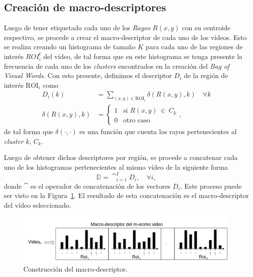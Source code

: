 	\subsection{Creación de macro-descriptores}
	\label{algoritmo:crea_macro-descriptores}
	Luego de tener etiquetado cada uno de los \textit{Rayos} $R(x,y)$ con su centroide respectivo, se procede a crear el macro-descriptor de cada uno de los vídeos.	 Esto se realiza creando un histograma de tamaño $K$ para cada uno de las regiones de interés ${ROI}_{i}^{t}$ del vídeo, de tal forma que en este histograma se tenga presente la frecuencia de cada uno de los \textit{clusters} encontrados en la creación del \textit{Bag of Visual Words}. Con esto presente, definimos el descriptor $D_i$ de la región de interés $\text{ROI}_i$ como
	\begin{align}
		\label{algoritmo:eq:hist}
		D_i(k) &= \sum_{(x,y)\in \text{ROI}_i} \delta (R(x,y),k) \quad \forall k\\
		\label{algoritmo:eq:fun_hist}
		 \delta (R(x,y),k) &= \begin{cases}
		 1 & \mbox{si }R(x,y)~\in~C_k\\
     0 & \text{otro caso}
     \end{cases},
	\end{align}
de tal forma que $\delta(\cdot,\cdot)$ es una función que cuenta los rayos pertenecientes al \textit{cluster} $k$, $C_k$.


	
	Luego de obtener dichos descriptores por región, se procede a concatenar cada uno de los histogramas pertenecientes al mismo vídeo de la siguiente forma
	\begin{equation}
		\mathds{D} = \cat_{i = 1}^{I} D_i, \quad \forall i,
	\end{equation}	   
   donde $\cat$ es el operador de concatenación de los vectores $D_i$. Este proceso puede ser visto en la Figura~\ref{algoritmo:fig:macrodescriptores}. El resultado de esta concatenación es el macro-descriptor del vídeo seleccionado.
   
   	\begin{figure}[bt]
		\centering
  		\label{algoritmo:fig:macrodescriptores}
    		\includegraphics[width=1\textwidth]{Figuras/Diagramas/macro-descriptor.png}
  		\caption{Construcción del macro-descriptor.}
	\end{figure}	



